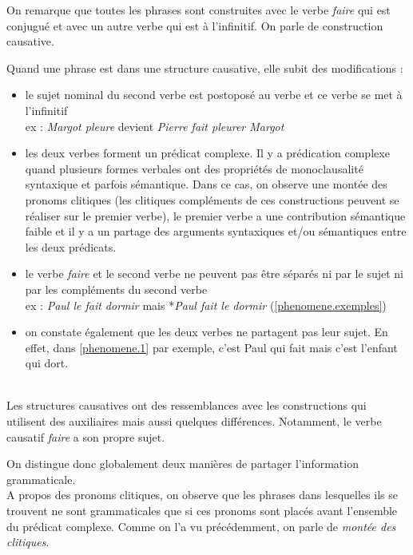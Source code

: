 On remarque que toutes les phrases sont construites avec le verbe \emph{faire} qui est conjugué et avec un autre verbe qui est à l'infinitif.
On parle de construction causative.

Quand une phrase est dans une structure causative, elle subit des modifications : \\

\begin{itemize}
  \item le sujet nominal du second verbe est postoposé au verbe et ce verbe se met à l'infinitif\\
    ex : \emph{Margot pleure} devient \emph{Pierre fait pleurer Margot}
  \item les deux verbes forment un prédicat complexe.
    Il y a prédication complexe quand plusieurs formes verbales ont des	propriétés de monoclausalité syntaxique et parfois sémantique.
    Dans ce cas, on observe une montée des pronoms clitiques (les clitiques compléments de ces constructions peuvent se réaliser sur le premier verbe), le premier verbe a une contribution sémantique faible et il y a un partage des arguments syntaxiques et/ou sémantiques entre les deux prédicats.
  \item le verbe \emph{faire} et le second verbe ne peuvent pas être séparés ni par le sujet ni par les compléments du second verbe\\
    ex \label{phenomene.1}: \emph{Paul le fait dormir} mais *\emph{Paul fait le dormir} (\autoref{phenomene.exemples})
  \item on constate également que les deux verbes ne partagent pas leur sujet.
    En effet, dans \autoref{phenomene.1} par exemple, c'est Paul qui fait mais c'est l'enfant qui dort.
\end{itemize}~{}\\

Les structures causatives ont des ressemblances avec les constructions qui utilisent des auxiliaires mais aussi quelques différences.
Notamment, le verbe causatif \emph{faire} a son propre sujet.

On distingue donc globalement deux manières de partager l'information grammaticale.\\

A propos des pronoms clitiques, on observe que les phrases dans lesquelles ils se trouvent ne sont grammaticales que si ces pronoms sont placés avant l'ensemble du prédicat complexe.
Comme on l'a vu précédemment, on parle de \emph{montée des clitiques}.\\

